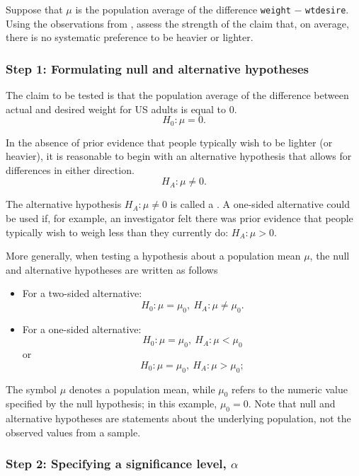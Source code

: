 Suppose that $\mu$ is the population average of the difference \texttt{weight} $-$ \texttt{wtdesire}. Using the observations from , assess the strength of the claim that, on average, there is no systematic preference to be heavier or lighter. 

\subsubsection{Step 1: Formulating null and alternative hypotheses}

The claim to be tested is that the population average of the difference between actual and desired weight for US adults is equal to 0. 
\[H_0: \mu = 0.\]

In the absence of prior evidence that people typically wish to be lighter (or heavier), it is reasonable to begin with an alternative hypothesis that allows for differences in either direction.
\[H_A: \mu \neq 0.\]

The alternative hypothesis $H_A: \mu \neq 0$ is called a . A one-sided alternative could be used if, for example, an investigator felt there was prior evidence that people typically wish to weigh less than they currently do: $H_A: \mu > 0$. 

More generally, when testing a hypothesis about a population mean $\mu$, the null and alternative hypotheses are written as follows

\begin{itemize}
	
    \item For a two-sided alternative: \[H_0: \mu = \mu_0, \ H_A: \mu \neq \mu_0.\]
    
    \item For a one-sided alternative: \[H_0: \mu = \mu_0, \ H_A: \mu < \mu_0\] or \[H_0: \mu = \mu_0, \  H_A: \mu > \mu_0;\]
	
\end{itemize}

The symbol $\mu$ denotes a population mean, while $\mu_0$ refers to the numeric value specified by the null hypothesis; in this example, $\mu_0 = 0$. Note that null and alternative hypotheses are statements about the underlying population, not the observed values from a sample. 

\subsubsection{Step 2: Specifying a significance level, $\alpha$}

